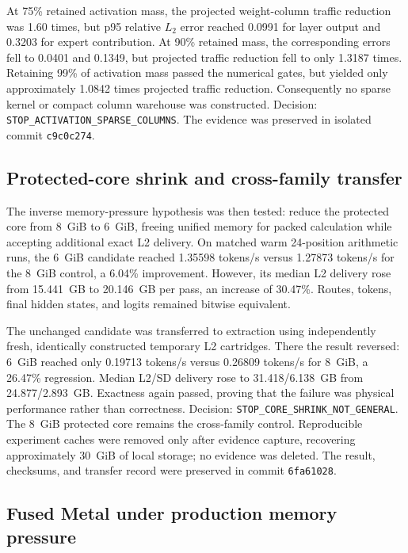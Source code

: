 At 75\% retained activation mass, the projected weight-column traffic reduction
was 1.60 times, but p95 relative $L_2$ error reached 0.0991 for layer output and
0.3203 for expert contribution.  At 90\% retained mass, the corresponding
errors fell to 0.0401 and 0.1349, but projected traffic reduction fell to only
1.3187 times.  Retaining 99\% of activation mass passed the numerical gates,
but yielded only approximately 1.0842 times projected traffic reduction.
Consequently no sparse kernel or compact column warehouse was constructed.
Decision: \texttt{STOP\_ACTIVATION\_SPARSE\_COLUMNS}.  The evidence was
preserved in isolated commit \texttt{c9c0c274}.

\subsection{Protected-core shrink and cross-family transfer}

The inverse memory-pressure hypothesis was then tested: reduce the protected
core from 8~GiB to 6~GiB, freeing unified memory for packed calculation while
accepting additional exact L2 delivery.  On matched warm 24-position arithmetic
runs, the 6~GiB candidate reached 1.35598 tokens/s versus 1.27873 tokens/s for
the 8~GiB control, a 6.04\% improvement.  However, its median L2 delivery rose
from 15.441~GB to 20.146~GB per pass, an increase of 30.47\%.  Routes, tokens,
final hidden states, and logits remained bitwise equivalent.

The unchanged candidate was transferred to extraction using independently
fresh, identically constructed temporary L2 cartridges.  There the result
reversed: 6~GiB reached only 0.19713 tokens/s versus 0.26809 tokens/s for 8~GiB,
a 26.47\% regression.  Median L2/SD delivery rose to 31.418/6.138~GB from
24.877/2.893~GB.  Exactness again passed, proving that the failure was physical
performance rather than correctness.  Decision:
\texttt{STOP\_CORE\_SHRINK\_NOT\_GENERAL}.  The 8~GiB protected core remains
the cross-family control.  Reproducible experiment caches were removed only
after evidence capture, recovering approximately 30~GiB of local storage; no
evidence was deleted.  The result, checksums, and transfer record were preserved
in commit \texttt{6fa61028}.

\subsection{Fused Metal under production memory pressure}

